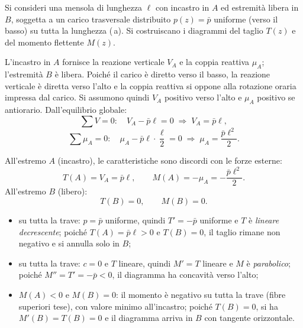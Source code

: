 \begin{esempio}
	Si consideri una mensola di lunghezza $\ell$
	con incastro in $A$ ed estremità libera in $B$,
	soggetta a un carico trasversale distribuito
	$p(z) = \bar{p}$ uniforme (verso il basso) su
	tutta la lunghezza (\,a).
	Si costruiscano i diagrammi del taglio $T(z)$
	e del momento flettente $M(z)$.
	
	\begin{svolgimento}
		



		
		
		
		L'incastro in $A$ fornisce la reazione verticale
		$V_A$ e la coppia reattiva $\mu_A$; l'estremità
		$B$ è libera.
		Poiché il carico è diretto verso il basso,
		la reazione verticale è diretta verso l'alto
		e la coppia reattiva si oppone alla rotazione
		oraria impressa dal carico.
		Si assumono quindi $V_A$ positivo verso l'alto
		e $\mu_A$ positivo se antiorario.
		Dall'equilibrio globale:
		\[
		\sum V = 0:\quad
		V_A - \bar{p}\ell = 0
		\;\Rightarrow\;
		V_A = \bar{p}\ell,
		\]
		\[
		\sum \mu_A = 0:\quad
		\mu_A - \bar{p}\ell\cdot\frac{\ell}{2} = 0
		\;\Rightarrow\;
		\mu_A = \frac{\bar{p}\ell^2}{2}.
		\]
		
		All'estremo $A$ (incastro), le caratteristiche
		sono discordi con le forze esterne:
		\[
		T(A) = V_A = \bar{p}\ell, \qquad
		M(A) = -\mu_A = -\frac{\bar{p}\ell^2}{2}.
		\]
		All'estremo $B$ (libero):
		\[
		T(B) = 0, \qquad M(B) = 0.
		\]
		
		\begin{itemize}[nosep]
			\item su tutta la trave: $p = \bar{p}$
			uniforme, quindi $T' = -\bar{p}$
			uniforme e $T$ è \emph{lineare
				decrescente}; poiché $T(A) = \bar{p}\ell > 0$
			e $T(B) = 0$, il taglio rimane non
			negativo e si annulla solo in $B$;
			\item su tutta la trave: $c = 0$ e $T$
			lineare, quindi $M' = T$ lineare
			e $M$ è \emph{parabolico}; poiché
			$M'' = T' = -\bar{p} < 0$, il
			diagramma ha concavità verso l'alto;
			\item $M(A) < 0$ e $M(B) = 0$: il momento
			è negativo su tutta la trave (fibre
			superiori tese), con valore minimo
			all'incastro; poiché $T(B) = 0$,
			si ha $M'(B) = T(B) = 0$ e il
			diagramma arriva in $B$ con tangente
			orizzontale.
		\end{itemize}
		

\end{svolgimento}
\end{esempio}
